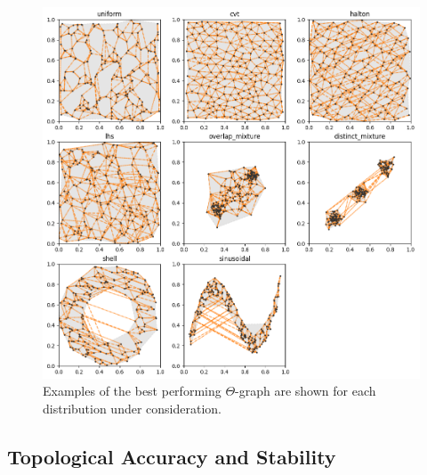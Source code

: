 \begin{figure}[htbp]
    \centering
    \includegraphics[width=\linewidth]{figs/chap7/theta_quality.png}
    \caption[Optimal $\Theta$-graphs for various two-dimensional distributions]{Examples of the best performing $\Theta$-graph are shown for each distribution under consideration.}
    \label{fig:theta_quality}
\end{figure}

\subsection{Topological Accuracy and Stability}

